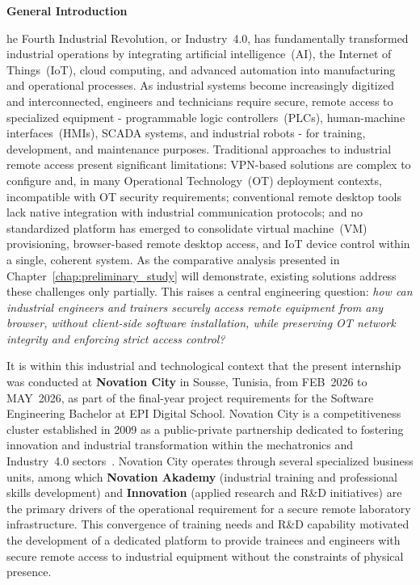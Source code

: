 {}
\setcounter{page}{1}
{\huge\bfseries General Introduction}

\vspace{1cm}

he Fourth Industrial Revolution, or Industry~4.0, has fundamentally
transformed industrial operations by integrating artificial intelligence~(AI),
the Internet of Things~(IoT), cloud computing, and advanced automation into
manufacturing and operational processes. As industrial systems become
increasingly digitized and interconnected, engineers and technicians require
secure, remote access to specialized equipment - programmable logic
controllers~(PLCs), human-machine interfaces~(HMIs), SCADA systems, and
industrial robots - for training, development, and maintenance purposes.
Traditional approaches to industrial remote access present significant
limitations: VPN-based solutions are complex to configure and, in many
Operational Technology~(OT) deployment contexts, incompatible with OT security
requirements; conventional remote desktop tools lack native integration with
industrial communication protocols; and no standardized platform has emerged to
consolidate virtual machine~(VM) provisioning, browser-based remote desktop
access, and IoT device control within a single, coherent system. As the
comparative analysis presented in Chapter~\ref{chap:preliminary_study} will demonstrate, existing solutions
address these challenges only partially. This raises a central engineering
question: \textit{how can industrial engineers and trainers securely access
remote equipment from any browser, without client-side software installation,
while preserving OT network integrity and enforcing strict access control?}

It is within this industrial and technological context that the present
internship was conducted at \textbf{Novation City} in Sousse, Tunisia, from
FEB~2026 to MAY~2026, as part of the final-year project requirements
for the Software Engineering Bachelor at EPI Digital School. Novation City is a competitiveness
cluster established in 2009 as a public-private partnership dedicated to
fostering innovation and industrial transformation within the mechatronics and
Industry~4.0 sectors~{\footnotesize\cite{novationcity2026}}. Novation City operates through
several specialized business units, among which \textbf{Novation Akademy}
(industrial training and professional skills development) and \textbf{Innovation}
(applied research and R\&D initiatives) are the primary drivers of the
operational requirement for a secure remote laboratory infrastructure. This
convergence of training needs and R\&D capability motivated the development of
a dedicated platform to provide trainees and engineers with secure remote
access to industrial equipment without the constraints of physical presence.

